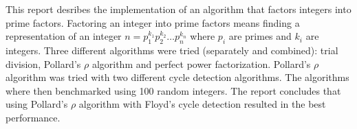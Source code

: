 This report desribes the implementation of an algorithm that factors integers 
into prime factors. Factoring an integer into prime factors means finding a
representation of an integer $n = p_1^{k_1}p_2^{k_2} \ldots p_n^{k_n}$ where
$p_i$ are primes and $k_i$ are integers.
Three different algorithms were tried (separately and combined): trial
division, Pollard's $\rho$ algorithm and perfect power factorization. Pollard's
$\rho$ algorithm was tried with two different cycle detection algorithms.
The algorithms where then benchmarked using 100 random integers. 
The report concludes
that using Pollard's $\rho$ algorithm with Floyd's cycle detection resulted in
the best performance.
